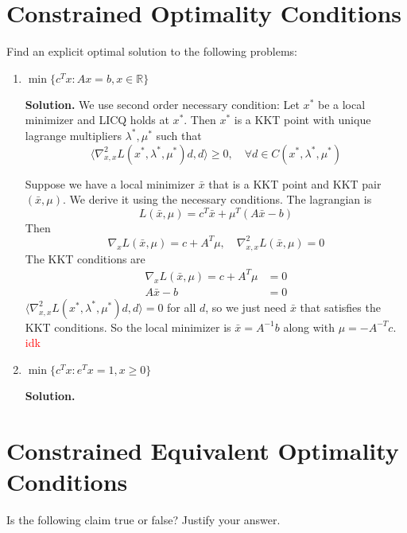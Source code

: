 \documentclass{article}
\begin{document}
\section{Constrained Optimality Conditions}
Find an explicit optimal solution to the following problems:
\begin{enumerate}
    \item $\min\{c^Tx : Ax = b, x \in \mathbb R\}$
    
    \textbf{Solution.} We use second order necessary condition: Let $x^*$ be a local minimizer and LICQ holds at $x^*$. Then $x^*$ is a KKT point with unique lagrange multipliers $\lambda^*, \mu^*$ such that $$\langle \nabla^2_{x, x} L(x^*, \lambda^*, \mu^*)d, d \rangle \geq 0, \quad \forall d \in C(x^*, \lambda^*, \mu^*)$$

    \bigskip
    Suppose we have a local minimizer $\bar x$ that is a KKT point and KKT pair $(\bar x, \mu)$. We derive it using the necessary conditions. The lagrangian is $$L(\bar x, \mu) = c^T\bar x + \mu^T(A\bar x - b)$$
    Then $$\nabla_x L(\bar x, \mu) = c + A^T\mu, \quad \nabla^2_{x, x} L(\bar x, \mu) = 0$$ The KKT conditions are 
    \begin{align*}
        \nabla_x L(\bar x, \mu) = c + A^T\mu &= 0 \\
        A\bar x - b &= 0
    \end{align*}
    $\langle \nabla^2_{x, x} L(x^*, \lambda^*, \mu^*)d, d \rangle = 0$ for all $d$, so we just need $\bar x$ that satisfies the KKT conditions. So the local minimizer is $\bar x = A^{-1}b$ along with $\mu = -A^{-T}c$. \textcolor{red}{idk}
    \item $\min\{c^Tx : e^Tx = 1, x \geq 0\}$
    
    \textbf{Solution.}
\end{enumerate}
\section{Constrained Equivalent Optimality Conditions}
Is the following claim true or false? Justify your answer.
\end{document}
